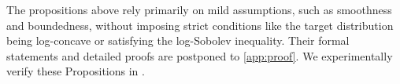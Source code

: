 The propositions above rely primarily on mild assumptions, such as smoothness and boundedness, without imposing strict conditions like the target distribution being log-concave or satisfying the log-Sobolev inequality.
%
Their formal statements and detailed proofs are postponed to \cref{app:proof}.
We experimentally verify these Propositions in .